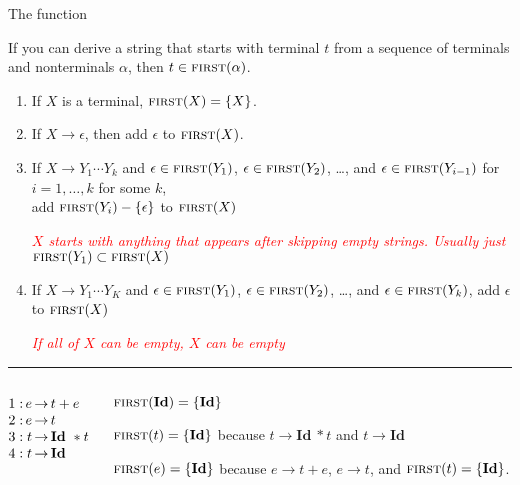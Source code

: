 \documentclass{plt}
\makeatletter
\newcommand{\id}{\textbf{Id}}
\newcommand{\grammarone}{
\renewcommand{\arraystretch}{1}
$\begin{array}[t]{@{}l@{\,}r@{\,}c@{\,}l@{}}
1: & e & \rightarrow & t + e \\
2: & e & \rightarrow & t \\
3: & t & \rightarrow & \id\ * t \\
4: & t & \rightarrow & \id
\end{array}$
}
\makeatother
\begin{document}
\begin{frame}{The \first{} function}
\footnotesize
\parskip=5pt

If you can derive a string that starts with terminal $t$ from a
sequence of terminals and nonterminals $\alpha$, then $t \in
\textsc{first}(\alpha)$.

\begin{enumerate}
\item If $X$ is a terminal, $\textsc{first}(X) = \{ X \}$.

\item If $X \rightarrow \epsilon$, then add $\epsilon$ to $\textsc{first}(X)$.

\item If $X \rightarrow Y_1 \cdots Y_k$ and
  $\epsilon \in \textsc{first}(Y_1)$,
  $\epsilon \in \textsc{first}(Y_2)$, \ldots, and $\epsilon \in
  \textsc{first}(Y_{i-1})$ for $i=1,\ldots, k$ for some $k$, \\ \quad add
  $\textsc{first}(Y_i) - \{ \epsilon \}$ to $\textsc{first}(X)$

    \textcolor{red}{\emph{$X$ starts with anything that appears after
      skipping empty strings. Usually just $\textsc{first}(Y_1) \subset \textsc{first}(X)$}}

\item If $X \rightarrow Y_1 \cdots Y_K$ and
  $\epsilon \in \textsc{first}(Y_1)$,
  $\epsilon \in \textsc{first}(Y_2)$, \ldots, and $\epsilon \in \textsc{first}(Y_k)$, add
  $\epsilon$ to $\textsc{first}(X)$

    \textcolor{red}{\emph{If all of $X$ can be empty, $X$ can be empty}}  
\end{enumerate}

\hrule

\vspace{5pt}

\begin{columns}
\begin{column}{0.3\textwidth}
\grammarone
\end{column}
\begin{column}{0.7\textwidth}
\parskip=5pt
$\first(\id) = \{ \id \}$

$\first(t) = \{ \id \}$ because $t \rightarrow \id\ * t$ and $t
  \rightarrow \id$

$\first(e) = \{ \id \}$ because $e \rightarrow t + e$, $e \rightarrow
  t$, and $\first(t) = \{ \id \}$.

\end{column}
\end{columns}

\end{frame}
\end{document}
